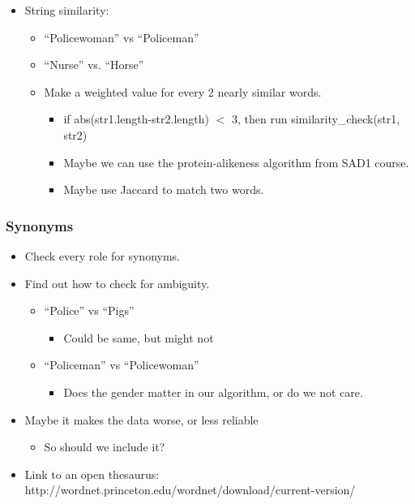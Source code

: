 \documentclass[a4paper,11pt]{article}
\begin{document}
\begin{itemize}
    \item String similarity: 
    \begin{itemize}
        \item “Policewoman” vs “Policeman” 
        \item “Nurse” vs. “Horse”
        \item Make a weighted value for every 2 nearly similar words.
        \begin{itemize}
            \item  if abs(str1.length-str2.length) $<$  3, then run similarity\_check(str1, str2)
            \item  Maybe we can use the protein-alikeness algorithm from SAD1 course.
            \item  Maybe use Jaccard to match two words. 
        \end{itemize}
    \end{itemize}
\end{itemize}

\subsubsection{Synonyms}
\begin{itemize}
    \item Check every role for synonyms.
    \item Find out how to check for ambiguity.
    \begin{itemize}
        \item “Police” vs “Pigs”
        \begin{itemize}
            \item Could be same, but might not
        \end{itemize}
        \item “Policeman” vs “Policewoman”
        \begin{itemize}
            \item Does the gender matter in our algorithm, or do we not care.
        \end{itemize}
    \end{itemize}
    \item Maybe it makes the data worse, or less reliable
    \begin{itemize}
        \item So should we include it?
    \end{itemize}
    \item Link to an open thesaurus: http://wordnet.princeton.edu/wordnet/download/current-version/ 
\end{itemize}
\end{document}
